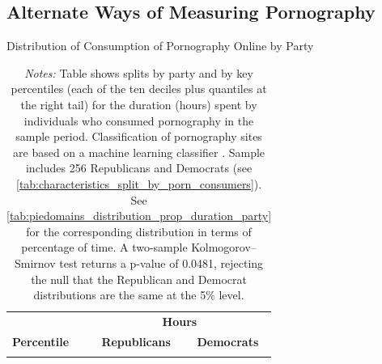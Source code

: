 \documentclass[12pt, letterpaper]{article}
\begin{document}
\FloatBarrier
\subsection{Alternate Ways of Measuring Pornography}
\label{si:alternate_ways}
\begin{table}[ht] \centering \small \setlength\tabcolsep{10 pt}
	\caption{Distribution of Consumption of Pornography Online by Party}
	\label{tab:piedomains_distribution_duration_party}
	\begin{adjustbox}{max width=\textwidth}
		\begin{tabular}{crr}
			\toprule
			\multicolumn{1}{l}{\textbf{}}&\multicolumn{2}{c}{\textbf{Hours}}\\
			\cmidrule(l){2-3}
			\multicolumn{1}{l}{\textbf{Percentile}}&\multicolumn{1}{c}{\textbf{Republicans}}&\multicolumn{1}{c}{\textbf{Democrats}}\\
			\midrule
			\\
			\bottomrule
		\end{tabular}
	\end{adjustbox}
	\caption*{\footnotesize \emph{Notes:} 
		Table shows splits by party and by key percentiles (each of the ten deciles plus quantiles at the right tail) for the duration (hours) spent by individuals who consumed pornography in the sample period. 
		Classification of pornography sites are based on a machine learning classifier \citep{Chintalapati_piedomains_Predict_the_2022}.
		Sample includes 256 Republicans and Democrats (see \cref{tab:characteristics_split_by_porn_consumers}).
		See \cref{tab:piedomains_distribution_prop_duration_party} for the corresponding distribution in terms of percentage of time. 
		A two-sample Kolmogorov–Smirnov test returns a p-value of 0.0481, rejecting the null that the Republican and Democrat distributions are the same at the 5\% level.
	}
\end{table}
\end{document}
